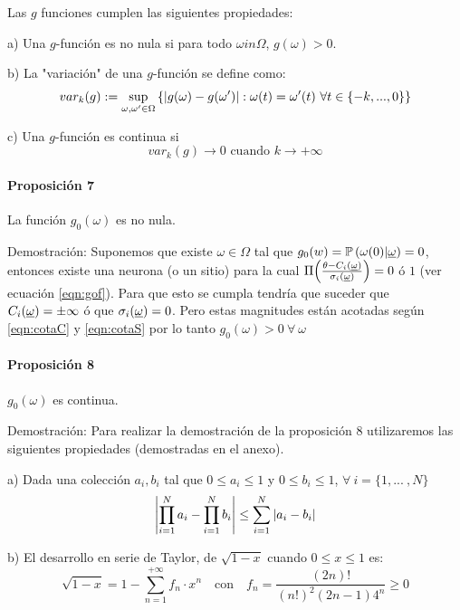 Las $g$ funciones cumplen las siguientes propiedades:

a) Una $g$-función es no nula si para todo $\omega in \Omega$, $g(\omega)>0$.

b) La "variación" de una $g$-función se define como:
\begin{equation}
    var_k(g):= \sup_{\omega,\omega' \in \Omega} \left\{\left|g(\omega)-g(\omega')\right|: \omega(t)=\omega'(t) \ \forall t \in \{-k, ... ,0\}\right\}
\end{equation}

c) Una $g$-función es continua si
\begin{equation}
    var_k(g) \rightarrow 0 \text{ cuando } k \rightarrow +\infty
\end{equation}

\paragraph{Proposición 7} La función $g_0(\omega)$ es no nula.

Demostración: Suponemos que existe $\omega \in \Omega$ tal que $g_0(w)=\mathbb{P}\left(\omega(0)|\underline{\omega}\right)=0$, entonces existe una neurona (o un sitio) para la cual $\Pi\!\left(\frac{\theta-C_i(\underline{\omega})}{\sigma_i(\underline{\omega})}\right) = 0$ ó $1$ (ver ecuación \eqref{eqn:gof}).
Para que esto se cumpla tendría que suceder que $C_i(\underline{\omega}) = \pm \infty$ ó que $\sigma_i(\underline{\omega}) = 0$. Pero estas magnitudes están acotadas según \eqref{eqn:cotaC} y \eqref{eqn:cotaS} por lo tanto $g_0(\omega) > 0 \ \forall \ \omega$


\paragraph{Proposición 8} $g_0(\omega)$ es continua.

Demostración: Para realizar la demostración de la proposición 8 utilizaremos las siguientes propiedades (demostradas en el anexo).

a) Dada una colección $a_i,b_i$ tal que $0\leq a_i\leq 1$ y $0 \leq b_i \leq 1$, $\forall \ i = \{1, ... \ , N\}$ 
\begin{equation}
    \left|\prod_{i=1}^N a_i - \prod_{i=1}^N b_i\right| \leq \sum_{i=1}^N \left|a_i - b_i\right|
\end{equation}

b) El desarrollo en serie de Taylor, de $\sqrt{1-x}$ cuando $0 \leq x \leq 1$ es:
\begin{equation}
    \sqrt{1-x}= 1-\sum_{n=1}^{+\infty} f_n \cdot x^n \quad \text{con} \quad f_n = \frac{(2n)!}{(n!)^2 (2n-1) 4^n} \geq 0
    \label{eqn:taylor}
\end{equation}

